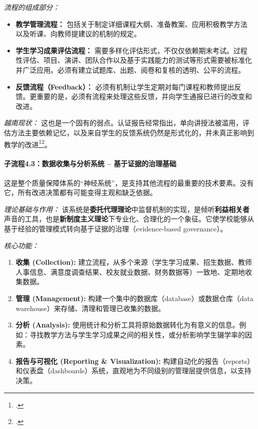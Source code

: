 \textit{流程的组成部分：}
\begin{itemize}
    \item \textbf{教学管理流程：} 包括关于制定详细课程大纲、准备教案、应用积极教学方法以及听课、向教师提建议的机制的规定。
    \item \textbf{学生学习成果评估流程：} 需要多样化评估形式，不仅仅依赖期末考试。过程性评估、项目、演讲、团队合作以及基于实践能力的测试等形式需要被标准化并广泛应用。必须有建立试题库、出题、阅卷和复核的透明、公平的流程。
    \item \textbf{反馈流程（Feedback）：} 必须有机制让学生定期对每门课程和教师提出反馈。更重要的是，必须有流程来处理这些反馈，并向学生通报已进行的改变和改进。
\end{itemize}

\textit{越南现状：} 这也是一个固有的弱点。认证报告经常指出，单向讲授法被滥用，评估方法主要依赖记忆，以及来自学生的反馈系统仍然是形式化的，并未真正影响到教学的改进\footcite{ExpertPerspectivesVN}\footcite{CommonFailureCriteria}。

\paragraph{子流程4.3：数据收集与分析系统 – 基于证据的治理基础}

这是整个质量保障体系的“神经系统”，是支持其他流程的最重要的技术要素。没有它，所有改进决策都有可能变得主观和缺乏依据。

\textit{理论基础与作用：} 该系统是\textbf{委托代理理论}中监督机制的实现，是倾听\textbf{利益相关者}声音的工具，也是\textbf{新制度主义理论}下专业化、合理化的一个象征。它使学校能够从基于经验的管理模式转向基于证据的治理（evidence-based governance）。

\textit{核心功能：}
\begin{enumerate}
    \item \textbf{收集 (Collection):} 建立流程，从多个来源（学生学习成果、招生数据、教师人事信息、满意度调查结果、校友就业数据、财务数据等）一致地、定期地收集数据。
    \item \textbf{管理 (Management):} 构建一个集中的数据库（database）或数据仓库（data warehouse）来存储、清理和管理已收集的数据。
    \item \textbf{分析 (Analysis):} 使用统计和分析工具将原始数据转化为有意义的信息。例如：寻找教学方法与学生学习成果之间的相关性，或分析影响学生辍学率的因素。
    \item \textbf{报告与可视化 (Reporting \& Visualization):} 构建自动化的报告（reports）和仪表盘（dashboards）系统，直观地为不同级别的管理层提供信息，以支持决策。
\end{enumerate}


